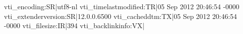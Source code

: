 vti_encoding:SR|utf8-nl
vti_timelastmodified:TR|05 Sep 2012 20:46:54 -0000
vti_extenderversion:SR|12.0.0.6500
vti_cacheddtm:TX|05 Sep 2012 20:46:54 -0000
vti_filesize:IR|394
vti_backlinkinfo:VX|
